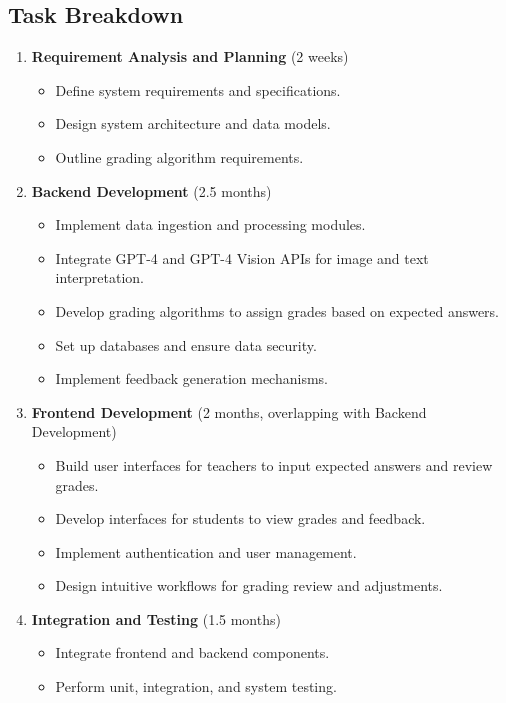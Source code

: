 \documentclass[ms,twoside,print]{nuthesis}
\begin{document}
\subsection{Task Breakdown}

\begin{enumerate}
    \item \textbf{Requirement Analysis and Planning} (2 weeks)
    \begin{itemize}
        \item Define system requirements and specifications.
        \item Design system architecture and data models.
        \item Outline grading algorithm requirements.
    \end{itemize}
    \item \textbf{Backend Development} (2.5 months)
    \begin{itemize}
        \item Implement data ingestion and processing modules.
        \item Integrate GPT-4 and GPT-4 Vision APIs for image and text interpretation.
        \item Develop grading algorithms to assign grades based on expected answers.
        \item Set up databases and ensure data security.
        \item Implement feedback generation mechanisms.
    \end{itemize}
    \item \textbf{Frontend Development} (2 months, overlapping with Backend Development)
    \begin{itemize}
        \item Build user interfaces for teachers to input expected answers and review grades.
        \item Develop interfaces for students to view grades and feedback.
        \item Implement authentication and user management.
        \item Design intuitive workflows for grading review and adjustments.
    \end{itemize}
    \item \textbf{Integration and Testing} (1.5 months)
    \begin{itemize}
        \item Integrate frontend and backend components.
        \item Perform unit, integration, and system testing.

\end{itemize}
\end{enumerate}
\end{document}
